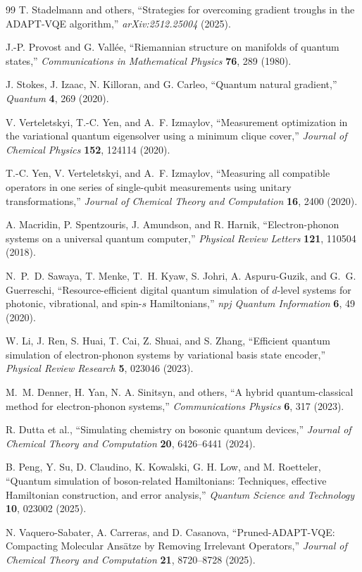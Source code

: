 \documentclass[
  reprint,
  amsmath,
  amssymb,
  aps,
  pra,
  nofootinbib,
  superscriptaddress,
  floatfix
]{revtex4-2}
\begin{document}
\begin{thebibliography}{99}
T. Stadelmann and others,
``Strategies for overcoming gradient troughs in the ADAPT-VQE algorithm,''
\emph{arXiv:2512.25004} (2025).

J.-P. Provost and G. Vall\'ee,
``Riemannian structure on manifolds of quantum states,''
\emph{Communications in Mathematical Physics} \textbf{76}, 289 (1980).

J. Stokes, J. Izaac, N. Killoran, and G. Carleo,
``Quantum natural gradient,''
\emph{Quantum} \textbf{4}, 269 (2020).

V. Verteletskyi, T.-C. Yen, and A.~F. Izmaylov,
``Measurement optimization in the variational quantum eigensolver using a minimum clique cover,''
\emph{Journal of Chemical Physics} \textbf{152}, 124114 (2020).

T.-C. Yen, V. Verteletskyi, and A.~F. Izmaylov,
``Measuring all compatible operators in one series of single-qubit measurements using unitary transformations,''
\emph{Journal of Chemical Theory and Computation} \textbf{16}, 2400 (2020).


A. Macridin, P. Spentzouris, J. Amundson, and R. Harnik,
``Electron-phonon systems on a universal quantum computer,''
\emph{Physical Review Letters} \textbf{121}, 110504 (2018).

N.~P.~D. Sawaya, T. Menke, T.~H. Kyaw, S. Johri, A. Aspuru-Guzik, and G.~G. Guerreschi,
``Resource-efficient digital quantum simulation of $d$-level systems for photonic, vibrational, and spin-$s$ Hamiltonians,''
\emph{npj Quantum Information} \textbf{6}, 49 (2020).

W. Li, J. Ren, S. Huai, T. Cai, Z. Shuai, and S. Zhang,
``Efficient quantum simulation of electron-phonon systems by variational basis state encoder,''
\emph{Physical Review Research} \textbf{5}, 023046 (2023).

M.~M. Denner, H. Yan, N. A. Sinitsyn, and others,
``A hybrid quantum-classical method for electron-phonon systems,''
\emph{Communications Physics} \textbf{6}, 317 (2023).

R. Dutta et al.,
``Simulating chemistry on bosonic quantum devices,''
\emph{Journal of Chemical Theory and Computation} \textbf{20}, 6426--6441 (2024).

B. Peng, Y. Su, D. Claudino, K. Kowalski, G. H. Low, and M. Roetteler,
``Quantum simulation of boson-related Hamiltonians: Techniques, effective Hamiltonian construction, and error analysis,''
\emph{Quantum Science and Technology} \textbf{10}, 023002 (2025).

N. Vaquero-Sabater, A. Carreras, and D. Casanova,
``Pruned-ADAPT-VQE: Compacting Molecular Ans\"atze by Removing Irrelevant Operators,''
\emph{Journal of Chemical Theory and Computation} \textbf{21}, 8720--8728 (2025).

\end{thebibliography}
\end{document}
